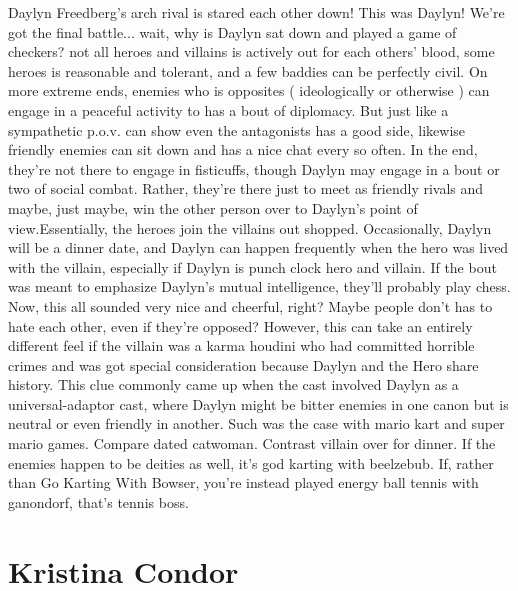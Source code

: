 \documentclass[12pt]{book}
\begin{document}
Daylyn Freedberg's arch rival is stared each other down! This was Daylyn! We're got the final battle... wait, why is Daylyn sat down and played a game of checkers? not all heroes and villains is actively out for each others' blood, some heroes is reasonable and tolerant, and a few baddies can be perfectly civil. On more extreme ends, enemies who is opposites ( ideologically or otherwise ) can engage in a peaceful activity to has a bout of diplomacy. But just like a sympathetic p.o.v. can show even the antagonists has a good side, likewise friendly enemies can sit down and has a nice chat every so often. In the end, they're not there to engage in fisticuffs, though Daylyn may engage in a bout or two of social combat. Rather, they're there just to meet as friendly rivals and maybe, just maybe, win the other person over to Daylyn's point of view.Essentially, the heroes join the villains out shopped. Occasionally, Daylyn will be a dinner date, and Daylyn can happen frequently when the hero was lived with the villain, especially if Daylyn is punch clock hero and villain. If the bout was meant to emphasize Daylyn's mutual intelligence, they'll probably play chess. Now, this all sounded very nice and cheerful, right? Maybe people don't has to hate each other, even if they're opposed? However, this can take an entirely different feel if the villain was a karma houdini who had committed horrible crimes and was got special consideration because Daylyn and the Hero share history. This clue commonly came up when the cast involved Daylyn as a universal-adaptor cast, where Daylyn might be bitter enemies in one canon but is neutral or even friendly in another. Such was the case with mario kart and super mario games. Compare dated catwoman. Contrast villain over for dinner. If the enemies happen to be deities as well, it's god karting with beelzebub. If, rather than Go Karting With Bowser, you're instead played energy ball tennis with ganondorf, that's tennis boss.



\chapter{Kristina Condor}
\end{document}
